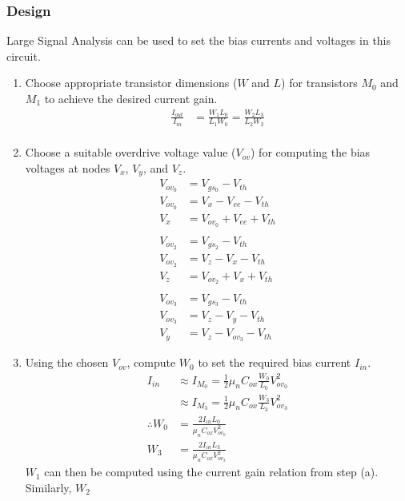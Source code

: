 \subsubsection{Design}
Large Signal Analysis can be used to set the bias
currents and voltages in this circuit.
\begin{enumerate}
  \item Choose appropriate transistor dimensions
    ($W$ and $L$) for transistors $M_0$ and $M_1$
    to achieve the desired current gain.
    \begin{align*}
      \frac{I_{out}}{I_{in}} &= \frac{W_1 L_0}{L_1 W_0} = \frac{W_2 L_3}{L_2 W_3} \\
    \end{align*}
  \item Choose a suitable overdrive voltage value
    ($V_{ov}$) for computing the bias voltages at
    nodes $V_{x}$, $V_{y}$, and $V_{z}$.
    \begin{align*}
      V_{ov_0} &= V_{gs_0} - V_{th} \\
      V_{ov_0} &= V_{x} - V_{ee} - V_{th} \\
      V_{x} &= V_{ov_0} + V_{ee} + V_{th} \\
      \\
      V_{ov_2} &= V_{gs_2} - V_{th} \\
      V_{ov_2} &= V_{z} - V_{x} - V_{th} \\
      V_{z} &= V_{ov_2} + V_{x} + V_{th} \\
      \\
      V_{ov_3} &= V_{gs_3} - V_{th} \\
      V_{ov_3} &= V_{z} - V_{y} - V_{th} \\
      V_{y} &= V_{z} - V_{ov_3} - V_{th}
    \end{align*}
  \item Using the chosen $V_{ov}$, compute $W_0$
    to set the required bias current $I_{in}$.
    \begin{align*}
      I_{in} &\approx I_{M_0} = \frac{1}{2} \mu_n C_{ox} \frac{W_0}{L_0} V_{ov_0}^2 \\
             &\approx I_{M_3} = \frac{1}{2} \mu_n C_{ox} \frac{W_3}{L_3} V_{ov_3}^2 \\
      \therefore W_0 &= \frac{2 I_{in} L_0}{\mu_n C_{ox} V_{ov_0}^2} \\
                 W_3 &= \frac{2 I_{in} L_3}{\mu_n C_{ox} V_{ov_3}^2}
    \end{align*}
    $W_1$ can then be computed using the current
    gain relation from step (a). Similarly, $W_2$

\end{enumerate}
